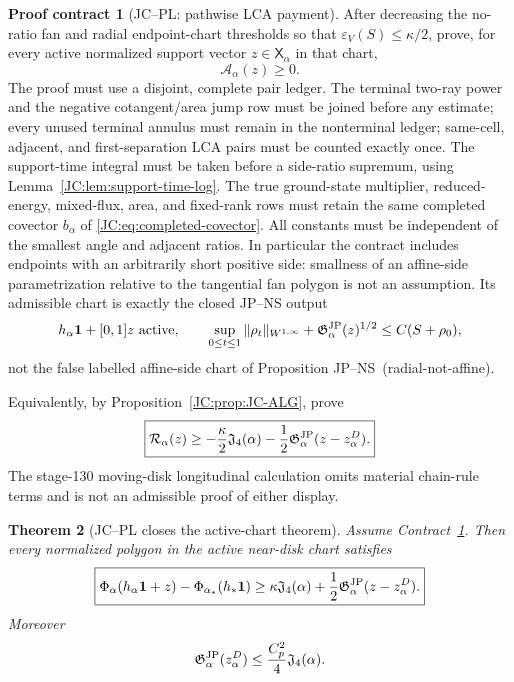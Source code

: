 \documentclass[11pt]{amsart}
\providecommand{\mathscr}{\mathcal}
\numberwithin{equation}{section}
\newtheorem{theorem}{Theorem}[section]
\theoremstyle{definition}
\newtheorem{contract}[theorem]{Proof contract}
\theoremstyle{remark}
\newcommand{\Jfour}{\mathfrak J_4}
\newcommand{\Gjp}{\mathfrak G^{\rm JP}}
\providecommand{\mathscr}[1]{\mathcal{#1}}
\begin{document}
\begin{contract}[JC--PL: pathwise LCA payment]
\label{JC:con:JC-PL}
After decreasing the no-ratio fan and radial endpoint-chart thresholds so that
$\varepsilon_V(S)\le\kappa/2$, prove, for every active normalized support
vector $z\in\mathsf X_\alpha$ in that chart,
\begin{equation}\label{JC:eq:JC-PL}
 \boxed{\mathscr A_\alpha(z)\ge0.}
\end{equation}
The proof must use a disjoint, complete pair ledger.  The terminal two-ray
power and the negative cotangent/area jump row must be joined before any
estimate; every unused terminal annulus must remain in the nonterminal
ledger; same-cell, adjacent, and first-separation LCA pairs must be counted
exactly once.  The support-time integral must be taken before a side-ratio
supremum, using Lemma~\ref{JC:lem:support-time-log}.  The true ground-state
multiplier, reduced-energy, mixed-flux, area, and fixed-rank rows must
retain the same completed covector $b_\alpha$ of
\eqref{JC:eq:completed-covector}.  All constants must be independent of the
smallest angle and adjacent ratios.  In particular the contract includes
endpoints with an arbitrarily short positive side: smallness of an
affine-side parametrization relative to the tangential fan polygon is not
an assumption.  Its admissible chart is exactly the closed JP--NS output
\[
 h_\alpha\mathbf1+[0,1]z\ \hbox{active},\qquad
 \sup_{0\le t\le1}\|\rho_t\|_{W^{1,\infty}}
 +\Gjp_\alpha(z)^{1/2}\le C(S+\rho_0),
\]
not the false labelled affine-side chart of
Proposition JP--NS~\textup{(radial-not-affine)}.

Equivalently, by Proposition~\ref{JC:prop:JC-ALG}, prove
\begin{equation}\label{JC:eq:JC}
\boxed{
 \mathscr R_\alpha(z)
 \ge-\frac\kappa2\Jfour(\alpha)
      -\frac12\Gjp_\alpha(z-z_\alpha^D).}
\end{equation}
The stage-130 moving-disk longitudinal calculation omits material
chain-rule terms and is not an admissible proof of either display.
\end{contract}

\begin{theorem}[JC--PL closes the active-chart theorem]\label{JC:thm:JC-to-J0}
Assume Contract~\ref{JC:con:JC-PL}.  Then every normalized polygon in the active
near-disk chart satisfies
\begin{equation}\label{JC:eq:J0}
\boxed{
 \Phi_\alpha(h_\alpha\mathbf1+z)
 -\Phi_{\alpha_*}(h_*\mathbf1)
 \ge\kappa\Jfour(\alpha)
      +\frac12\Gjp_\alpha(z-z_\alpha^D).}
\end{equation}
Moreover
\begin{equation}\label{JC:eq:corrector-bound}
 \Gjp_\alpha(z_\alpha^D)
 \le\frac{C_p^2}{4}\Jfour(\alpha).
\end{equation}
\end{theorem}
\end{document}
